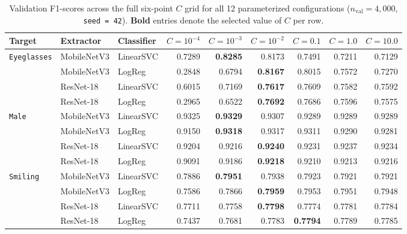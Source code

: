 \documentclass[12pt,a4paper]{article}
\newcommand{\code}[1]{\texttt{#1}}
\begin{document}
\begin{table}[H]
  \centering
  \caption[Full validation F1-score tuning grid across C]{Validation F1-scores across the full six-point $C$ grid for all 12 parameterized configurations ($n_{\text{val}} = 4{,}000$, \code{seed = 42}). \textbf{Bold} entries denote the selected value of $C$ per row.}
  \label{tab:full_c_grid}
  \footnotesize
  \begin{tabular}{@{}l l l r r r r r r@{}}
    \toprule
    \textbf{Target} & \textbf{Extractor} & \textbf{Classifier} & $C{=}10^{-4}$ & $C{=}10^{-3}$ & $C{=}10^{-2}$ & $C{=}0.1$ & $C{=}1.0$ & $C{=}10.0$ \\
    \midrule
    \multirow{4}{*}{\code{Eyeglasses}}
      & MobileNetV3 & LinearSVC & 0.7289 & \textbf{0.8285} & 0.8173 & 0.7491 & 0.7211 & 0.7129 \\
      & MobileNetV3 & LogReg    & 0.2848 & 0.6794 & \textbf{0.8167} & 0.8015 & 0.7572 & 0.7270 \\
      & ResNet-18   & LinearSVC & 0.6015 & 0.7169 & \textbf{0.7617} & 0.7609 & 0.7582 & 0.7592 \\
      & ResNet-18   & LogReg    & 0.2965 & 0.6522 & \textbf{0.7692} & 0.7686 & 0.7596 & 0.7575 \\
    \midrule
    \multirow{4}{*}{\code{Male}}
      & MobileNetV3 & LinearSVC & 0.9325 & \textbf{0.9329} & 0.9307 & 0.9289 & 0.9289 & 0.9289 \\
      & MobileNetV3 & LogReg    & 0.9150 & \textbf{0.9318} & 0.9317 & 0.9311 & 0.9290 & 0.9281 \\
      & ResNet-18   & LinearSVC & 0.9204 & 0.9216 & \textbf{0.9240} & 0.9231 & 0.9237 & 0.9234 \\
      & ResNet-18   & LogReg    & 0.9091 & 0.9186 & \textbf{0.9218} & 0.9210 & 0.9213 & 0.9216 \\
    \midrule
    \multirow{4}{*}{\code{Smiling}}
      & MobileNetV3 & LinearSVC & 0.7886 & \textbf{0.7951} & 0.7938 & 0.7923 & 0.7921 & 0.7921 \\
      & MobileNetV3 & LogReg    & 0.7586 & 0.7866 & \textbf{0.7959} & 0.7953 & 0.7951 & 0.7948 \\
      & ResNet-18   & LinearSVC & 0.7711 & 0.7758 & \textbf{0.7798} & 0.7774 & 0.7781 & 0.7784 \\
      & ResNet-18   & LogReg    & 0.7437 & 0.7681 & 0.7783 & \textbf{0.7794} & 0.7789 & 0.7785 \\
    \bottomrule
  \end{tabular}
\end{table}
\end{document}
